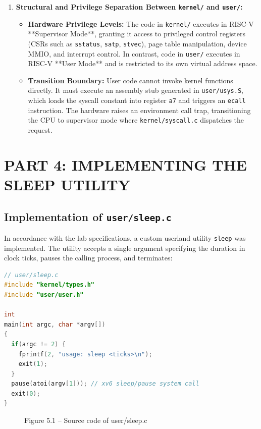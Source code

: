 \documentclass[12pt,a4paper]{report}
\numberwithin{equation}{chapter}
\numberwithin{figure}{chapter}
\numberwithin{table}{chapter}
\begin{document}
\begin{enumerate}
    \item \textbf{Structural and Privilege Separation Between \texttt{kernel/} and \texttt{user/}:}
    \begin{itemize}
        \item \textbf{Hardware Privilege Levels:} The code in \texttt{kernel/} executes in RISC-V **Supervisor Mode**, granting it access to privileged control registers (CSRs such as \texttt{sstatus}, \texttt{satp}, \texttt{stvec}), page table manipulation, device MMIO, and interrupt control. In contrast, code in \texttt{user/} executes in RISC-V **User Mode** and is restricted to its own virtual address space.
        \item \textbf{Transition Boundary:} User code cannot invoke kernel functions directly. It must execute an assembly stub generated in \texttt{user/usys.S}, which loads the syscall constant into register \texttt{a7} and triggers an \texttt{ecall} instruction. The hardware raises an environment call trap, transitioning the CPU to supervisor mode where \texttt{kernel/syscall.c} dispatches the request.
    \end{itemize}
\end{enumerate}

\chapter{PART 4: IMPLEMENTING THE SLEEP UTILITY}

\section{Implementation of \texttt{user/sleep.c}}
In accordance with the lab specifications, a custom userland utility \texttt{sleep} was implemented. The utility accepts a single argument specifying the duration in clock ticks, pauses the calling process, and terminates:

\begin{lstlisting}[language=c]
// user/sleep.c
#include "kernel/types.h"
#include "user/user.h"

int
main(int argc, char *argv[])
{
  if(argc != 2) {
    fprintf(2, "usage: sleep <ticks>\n");
    exit(1);
  }
  pause(atoi(argv[1])); // xv6 sleep/pause system call
  exit(0);
}
\end{lstlisting}

\begin{figure}[H]
\centering
\caption{Figure 5.1 -- Source code of user/sleep.c}
\end{figure}
\end{document}
